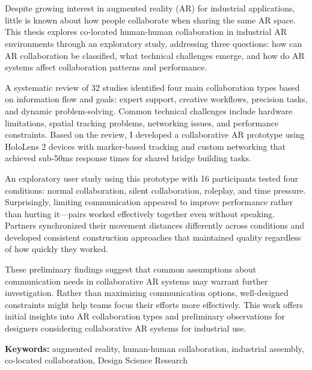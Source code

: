 \chapter{\abstractname}

Despite growing interest in augmented reality (AR) for industrial applications, little is known about how people collaborate when sharing the same AR space. This thesis explores co-located human-human collaboration in industrial AR environments through an exploratory study, addressing three questions: how can AR collaboration be classified, what technical challenges emerge, and how do AR systems affect collaboration patterns and performance.

A systematic review of 32 studies identified four main collaboration types based on information flow and goals: expert support, creative workflows, precision tasks, and dynamic problem-solving. Common technical challenges include hardware limitations, spatial tracking problems, networking issues, and performance constraints. Based on the review, I developed a collaborative AR prototype using HoloLens 2 devices with marker-based tracking and custom networking that achieved sub-50ms response times for shared bridge building tasks.

An exploratory user study using this prototype with 16 participants tested four conditions: normal collaboration, silent collaboration, roleplay, and time pressure. Surprisingly, limiting communication appeared to improve performance rather than hurting it—pairs worked effectively together even without speaking. Partners synchronized their movement distances differently across conditions and developed consistent construction approaches that maintained quality regardless of how quickly they worked.

These preliminary findings suggest that common assumptions about communication needs in collaborative AR systems may warrant further investigation. Rather than maximizing communication options, well-designed constraints might help teams focus their efforts more effectively. This work offers initial insights into AR collaboration types and preliminary observations for designers considering collaborative AR systems for industrial use.

\textbf{Keywords:} augmented reality, human-human collaboration, industrial assembly, co-located collaboration, Design Science Research

\makeatletter
{}
{\renewcommand{\abstractname}{Kurzfassung}}
{\renewcommand{\abstractname}{Abstract}}
\makeatother

